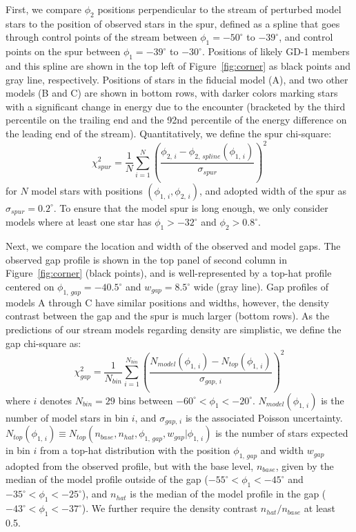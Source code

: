 \documentclass[twocolumn]{aastex62}
\begin{document}
First, we compare $\phi_2$ positions perpendicular to the stream of perturbed model stars to the position of observed stars in the spur, defined as a spline that goes through control points of the stream between $\phi_1=-50^\circ$ to $-39^\circ$, and control points on the spur between $\phi_1=-39^\circ$ to $-30^\circ$.
Positions of likely GD-1 members and this spline are shown in the top left of Figure~\ref{fig:corner} as black points and gray line, respectively.
Positions of stars in the fiducial model (A), and two other models (B and C) are shown in bottom rows, with darker colors marking stars with a significant change in energy due to the encounter (bracketed by the third percentile on the trailing end and the 92nd percentile of the energy difference on the leading end of the stream).
Quantitatively, we define the spur chi-square:
\begin{equation}
\chi^2_{spur} = \frac{1}{N}\sum_{i=1}^{N} \left(\frac{\phi_{2,\,i} - \phi_{2,\,spline}(\phi_{1,\,i})}{\sigma_{spur}}\right)^2
\end{equation}
for $N$ model stars with positions $(\phi_{1,\,i}, \phi_{2,\,i})$, and adopted width of the spur as $\sigma_{spur} = 0.2^\circ$.
To ensure that the model spur is long enough, we only consider models where at least one star has $\phi_1>-32^\circ$ and $\phi_2>0.8^\circ$.

Next, we compare the location and width of the observed and model gaps.
The observed gap profile is shown in the top panel of second column in Figure~\ref{fig:corner} (black points), and is well-represented by a top-hat profile centered on $\phi_{1,\,gap}=-40.5^\circ$ and $w_{gap}=8.5^\circ$ wide (gray line).
Gap profiles of models A through C have similar positions and widths, however, the density contrast between the gap and the spur is much larger (bottom rows).
As the predictions of our stream models regarding density are simplistic, we define the gap chi-square as:
\begin{equation}
\chi^2_{gap} = \frac{1}{N_{bin}}\sum_{i=1}^{N_{bin}} \left(\frac{N_{model}(\phi_{1,\,i}) - N_{top}(\phi_{1,\,i})}{\sigma_{gap,\,i}}\right)^2
\end{equation}
where $i$ denotes $N_{bin}=29$ bins between $-60^\circ<\phi_1<-20^\circ$.
$N_{model}(\phi_{1,\,i})$ is the number of model stars in bin $i$, and $\sigma_{gap,\,i}$ is the associated Poisson uncertainty.
$N_{top}(\phi_{1,\,i})\equiv N_{top}(n_{base}, n_{hat}, \phi_{1,\,gap}, w_{gap} | \phi_{1,\,i})$ is the number of stars expected in bin $i$ from a top-hat distribution with the position $\phi_{1,\,gap}$ and width $w_{gap}$ adopted from the observed profile, but with the base level, $n_{base}$, given by the median of the model profile outside of the gap ($-55^\circ<\phi_1<-45^\circ$ and $-35^\circ<\phi_1<-25^\circ$), and $n_{hat}$ is the median of the model profile in the gap ($-43^\circ<\phi_1<-37^\circ$).
We further require the density contrast $n_{hat} / n_{base}$ at least 0.5.
\end{document}
